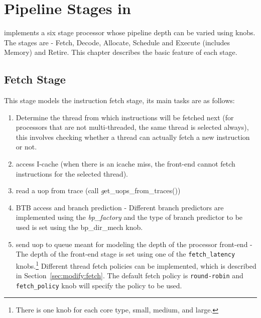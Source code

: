 


\chapter{Pipeline Stages in \SIM}

\SIM implements a six stage processor whose pipeline depth can be varied using
knobs. The stages are - Fetch, Decode, Allocate, Schedule and Execute (includes
    Memory) and Retire. This chapter describes the basic feature of each
stage.

\section{Fetch Stage}
This stage models the instruction fetch stage, its main tasks
are as follows:

\begin{enumerate}

\item Determine the thread from which instructions will be fetched next (for
    processors that are not multi-threaded, the same thread is selected
    always), this involves checking whether a thread can actually fetch a new
instruction or not.


\item access I-cache (when there is an icache miss, the front-end cannot fetch
    instructions for the selected thread).

\item read a uop from trace (call {\textit get\_uops\_from\_traces()})

\item BTB access and branch prediction - Different branch predictors
  are implemented using the \textit{bp\_factory} and the type of
  branch predictor to be used is set using the bp\_dir\_mech knob.

\item send uop to queue meant for modeling the depth of the processor
  front-end - The depth of the front-end stage is set using one of the
  \Verb+fetch_latency+ knobs.\footnote{There is one knob for each core
    type, small, medium, and large.} Different thread fetch policies
  can be implemented, which is described in
  Section~\ref{sec:modify:fetch}. The default fetch policy is
  \Verb+round-robin+ and \Verb+fetch_policy+ knob will specify the
  policy to be used.


\end{enumerate}


